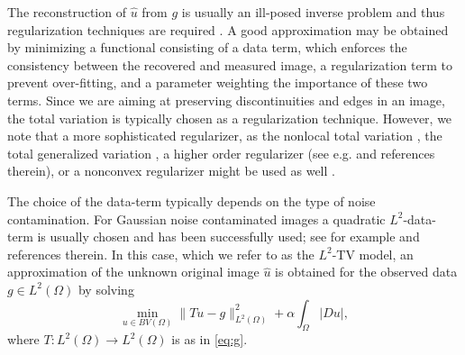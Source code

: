 \documentclass[enabledeprecatedfontcommands,cleardoublepage=empty,headsepline,twoside,11pt,DIV=15,BCOR=12mm,final]{scrartcl}
\begin{document}
The reconstruction of $\hat{u}$ from $g$ is usually an ill-posed inverse problem and thus regularization techniques are required \cite{EnHaNe:96}. A good approximation may be obtained by minimizing a functional consisting of a data term, which enforces the consistency between the recovered and measured image, a regularization term to prevent over-fitting, and a parameter weighting the importance of these two terms. Since we are aiming at preserving discontinuities and edges in an image, the total variation is typically chosen as a regularization technique. However, we note that a more sophisticated regularizer, as the nonlocal total variation \cite{KiOsJo:05}, the total generalized variation \cite{BrKuPo:10}, a higher order regularizer (see e.g. \cite{PapafitsorosSchonlieb:14} and references therein), or a nonconvex regularizer might be used as well \cite{NiNgZhCh:08}. 

The choice of the data-term typically depends on the type of noise contamination. For Gaussian noise contaminated images a quadratic $L^2$-data-term is usually chosen and has been successfully used; see for example \cite{BuSaSt:16} and references therein. %
In this case, which we refer to as the $L^2$-TV model, an approximation of the unknown original image $\hat{u}$ is obtained for the observed data $g \in L^2(\Omega)$ by solving 
\begin{equation}\label{L2TV}
\min_{u\in BV(\Omega)} \|Tu-g\|_{L^2(\Omega)}^2 + \alpha \int_{\Omega}|Du|,
\end{equation}
where $T : L^2(\Omega) \to L^2(\Omega)$ is as in \eqref{eq:g}. 
\end{document}
